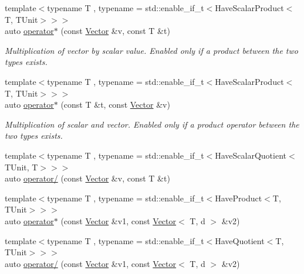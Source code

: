 \begin{DoxyCompactItemize}
\hypertarget{classVector_a60bf5a2966cbdacbd2a4f39de8157c77}{}\label{classVector_a60bf5a2966cbdacbd2a4f39de8157c77} 
{\footnotesize template$<$typename T , typename  = std\+::enable\+\_\+if\+\_\+t$<$\+Have\+Scalar\+Product$<$\+T, T\+Unit$>$$>$$>$ }\\auto \hyperlink{classVector_a60bf5a2966cbdacbd2a4f39de8157c77}{operator$\ast$} (const \hyperlink{classVector}{Vector} \&v, const T \&t)
\begin{DoxyCompactList}\small\item\em Multiplication of vector by scalar value. Enabled only if a product between the two types exists. \end{DoxyCompactList}\item 
\hypertarget{classVector_a73d9b4f5fa688819788dce765fa2781d}{}\label{classVector_a73d9b4f5fa688819788dce765fa2781d} 
{\footnotesize template$<$typename T , typename  = std\+::enable\+\_\+if\+\_\+t$<$\+Have\+Scalar\+Product$<$\+T, T\+Unit$>$$>$$>$ }\\auto \hyperlink{classVector_a73d9b4f5fa688819788dce765fa2781d}{operator$\ast$} (const T \&t, const \hyperlink{classVector}{Vector} \&v)
\begin{DoxyCompactList}\small\item\em Multiplication of scalar and vector. Enabled only if a product operator between the two types exists. \end{DoxyCompactList}\item 
{\footnotesize template$<$typename T , typename  = std\+::enable\+\_\+if\+\_\+t$<$\+Have\+Scalar\+Quotient$<$\+T\+Unit, T$>$$>$$>$ }\\auto \hyperlink{classVector_a6da5d490ff6380328266f2b24a2d85e7}{operator/} (const \hyperlink{classVector}{Vector} \&v, const T \&t)
\item 
{\footnotesize template$<$typename T , typename  = std\+::enable\+\_\+if\+\_\+t$<$\+Have\+Product$<$\+T, T\+Unit$>$$>$$>$ }\\auto \hyperlink{classVector_ae0327ce67bfbacc8e20970e5fe0319d6}{operator$\ast$} (const \hyperlink{classVector}{Vector} \&v1, const \hyperlink{classVector}{Vector}$<$ T, d $>$ \&v2)
\item 
{\footnotesize template$<$typename T , typename  = std\+::enable\+\_\+if\+\_\+t$<$\+Have\+Quotient$<$\+T, T\+Unit$>$$>$$>$ }\\auto \hyperlink{classVector_ada2ba21f8fde22223f85c7b017321d8b}{operator/} (const \hyperlink{classVector}{Vector} \&v1, const \hyperlink{classVector}{Vector}$<$ T, d $>$ \&v2)
\end{DoxyCompactItemize}


